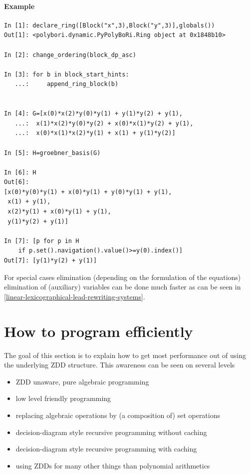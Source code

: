 \paragraph{Example} %
\label{par:example-elimination}
\begin{lstlisting}
In [1]: declare_ring([Block("x",3),Block("y",3)],globals())
Out[1]: <polybori.dynamic.PyPolyBoRi.Ring object at 0x1848b10>

In [2]: change_ordering(block_dp_asc)

In [3]: for b in block_start_hints:
   ...:     append_ring_block(b)
     

In [4]: G=[x(0)*x(2)*y(0)*y(1) + y(1)*y(2) + y(1),
   ...:  x(1)*x(2)*y(0)*y(2) + x(0)*x(1)*y(2) + y(1),
   ...:  x(0)*x(1)*x(2)*y(1) + x(1) + y(1)*y(2)]

In [5]: H=groebner_basis(G)

In [6]: H
Out[6]: 
[x(0)*y(0)*y(1) + x(0)*y(1) + y(0)*y(1) + y(1),
 x(1) + y(1),
 x(2)*y(1) + x(0)*y(1) + y(1),
 y(1)*y(2) + y(1)]

In [7]: [p for p in H 
    if p.set().navigation().value()>=y(0).index()]
Out[7]: [y(1)*y(2) + y(1)]
\end{lstlisting}

For special cases elimination (depending on the formulation of the equations) elimination of (auxiliary) variables can be done much faster as can be seen in \ref{linear-lexicographical-lead-rewriting-systems}.



\section{How to program efficiently}
\label{sec:program-efficiently}
The goal of this section is to explain how to get most performance out of \PolyBoRi using the underlying ZDD structure.
This awareness can be seen on several levels
\begin{itemize}
    \item ZDD unaware, pure algebraic programming 
    \item low level friendly programming
    \item replacing algebraic operations by (a composition of) set operations
    \item decision-diagram style recursive programming without caching
    \item decision-diagram style recursive programming with caching
    \item using ZDDs for many other things than polynomial arithmetics
\end{itemize}
